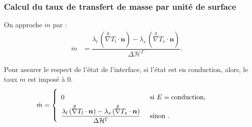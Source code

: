 \documentclass{beamer}
\newcommand{\vect}[1]{\bm{#1}}
\newcommand{\norm}{\vect{n}}
\newcommand{\ghost}{\overset{{g}}{\nabla}}
\renewcommand{\frac}{\dfrac}
\begin{document}
\begin{frame}
    \frametitle{Calcul du taux de transfert de masse par unité de surface}
	\footnotesize
On approche $\Dot{m}$ par : 
\begin{align} \label{eq:mPoint}
	\Dot{m} &= \frac{\lambda_l \, (\ghost T_l \cdot \norm) - \lambda_s \, (\ghost T_s \cdot \norm)}{\Delta \mathcal{H}^\Gamma}.
\end{align}

Pour assurer le respect de l'état de l'interface, si l'état est en conduction, alors, le taux $\Dot{m}$ est imposé à $0$.
\begin{align}
	\Dot{m} &= \left\{ {\renewcommand{\arraystretch}{2}\begin{array}{l l} 
	0 &\text{ si } E = \text{conduction},\\
	\frac{\lambda_l \, (\ghost T_l \cdot \norm) - \lambda_s \, (\ghost T_s \cdot \norm)}{\Delta \mathcal{H}^\Gamma} &\text{ sinon }.
	\end{array}}\right.	
\end{align}
\vspace{0.4cm}
\center{}
\end{frame}
\end{document}
